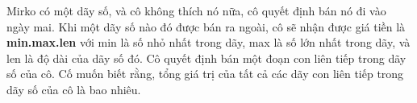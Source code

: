 Mirko có một dãy số, và cô không thích nó nữa, cô quyết định bán nó đi vào ngày mai. Khi một dãy số nào đó được bán ra ngoài, cô sẽ nhận được giá tiền là   \textbf{    min.max.len   }   với min là số nhỏ nhất trong dãy, max là số lớn nhất trong dãy, và len là độ dài của dãy số đó. Cô quyết định bán một đoạn con liên tiếp trong dãy số của cô. Cố muốn biết rằng, tổng giá trị của tất cả các dãy con liên tiếp trong dãy số của cô là bao nhiêu.  

\